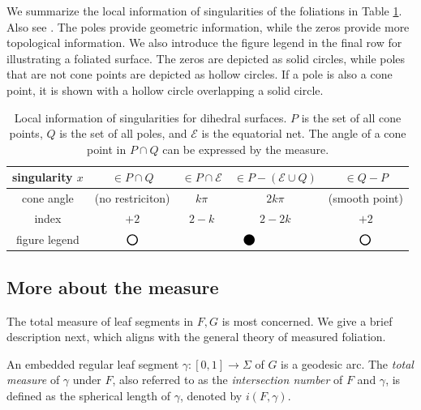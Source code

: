 \documentclass[pdflatex,sn-mathphys]{sn-jnl}%
\numberwithin{equation}{section}
\theoremstyle{thmstyleone}%
\newcommand{\mfoli}{measured foliation}
\newcommand{\DEF}{\emph}
\begin{document}
We summarize the local information of singularities of the foliations in Table \ref{tab:singularity}. Also see \cite[Section 2.2]{GT23}. The poles provide geometric information, while the zeros provide more topological information. We also introduce the figure legend in the final row for illustrating a foliated surface. The zeros are depicted as solid circles, while poles that are not cone points are depicted as hollow circles. If a pole is also a cone point, it is shown with a hollow circle overlapping a solid circle. %
\begin{table}[h] %
\centering
\normalsize
\renewcommand\arraystretch{1.4}
\begin{tabular}{c||c|c|c|c}
    singularity $x$ & $\in P \cap Q$ & $\in P \cap \mathcal{E}$ & $\in P - (\mathcal{E}\cup Q)$ & $\in Q-P$ \\
    \hline
    cone angle & (no restriciton) & $k \pi$ & $ 2k \pi $ & (smooth point) \\
    \hline
    index & $+2$ & $2-k$ & $2-2k$ & $+2$ \\
    \hline
    figure legend 
    & \rlap{$\raisebox{-0.9ex}{\text{\larger[5]\ensuremath{\bullet}}}$} $\raisebox{-0.9ex}{\text{\larger[5]\ensuremath{\circ}}}$ 
    & \multicolumn{2}{c|}{ $\raisebox{-0.9ex}{\text{\larger[5]\ensuremath{\bullet}}}$ } 
    & $\raisebox{-0.9ex}{\text{\larger[5]\ensuremath{\circ}}}$
\end{tabular}
\vspace{4pt}
\caption{Local information of singularities for dihedral surfaces. $P$ is the set of all cone points, $Q$ is the set of all poles, and $\mathcal{E}$ is the equatorial net.
The angle of a cone point in $P\cap Q$ can be expressed by the measure. }
\label{tab:singularity}
\end{table}


\subsection{More about the measure}\label{sec:bt_meas}
The total measure of leaf segments in $F,G$ is most concerned. We give a brief description next, which aligns with the general theory of \mfoli.

An embedded regular leaf segment $\gamma:[0,1]\to\Sigma$ of $G$ %
is a geodesic arc. The \DEF{total measure} of $\gamma$ under $F$, also referred to as the \DEF{intersection number} of $F$ and $\gamma$, is defined as the spherical length of $\gamma$, denoted by $i(F,\gamma)$.
\end{document}
